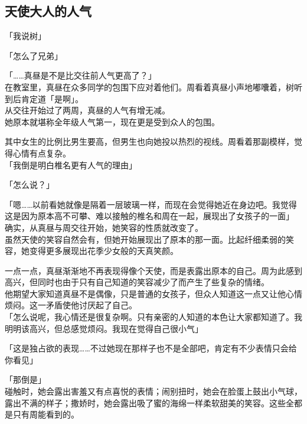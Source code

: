 \subsection{天使大人的人气}

「我说树」

「怎么了兄弟」

「……真昼是不是比交往前人气更高了？」\\

在教室里，真昼在众多同学的包围下应对着他们。周看着真昼小声地嘟囔着，树听到后肯定道「是啊」。\\

从交往开始过了两周，真昼的人气有增无减。\\

她原本就堪称全年级人气第一，现在更是受到众人的包围。

其中女生的比例比男生要高，但男生也向她投以热烈的视线。周看着那副模样，觉得心情有点复杂。\\

「我倒是明白椎名更有人气的理由」

「怎么说？」

「嗯……以前看她就像是隔着一层玻璃一样，而现在会觉得她近在身边吧。我觉得这是因为原本高不可攀、难以接触的椎名和周在一起，展现出了女孩子的一面」\\

确实，从真昼与周交往开始，她笑容的性质就改变了。\\

虽然天使的笑容自然会有，但她开始展现出了原本的那一面。比起纤细柔弱的笑容，她变得更多展现出花季少女般的天真笑颜。

一点一点，真昼渐渐地不再表现得像个天使，而是表露出原本的自己。周为此感到高兴，但同时也由于只有自己知道的笑容减少了而产生了些复杂的情绪。\\

他期望大家知道真昼不是偶像，只是普通的女孩子，但众人知道这一点又让他心情烦闷。这一矛盾使他讨厌起了自己。\\

「怎么说呢，我心情还是很复杂啊。只有亲密的人知道的本色让大家都知道了。我明明该高兴，但总感觉烦闷。我现在觉得自己很小气」

「这是独占欲的表现……不过她现在那样子也不是全部吧，肯定有不少表情只会给你看见」

「那倒是」\\

碰触时，她会露出害羞又有点喜悦的表情；闹别扭时，她会在脸蛋上鼓出小气球，露出不满的样子；撒娇时，她会露出吸了蜜的海绵一样柔软甜美的笑容。这些全都是只有周能看到的。\\

